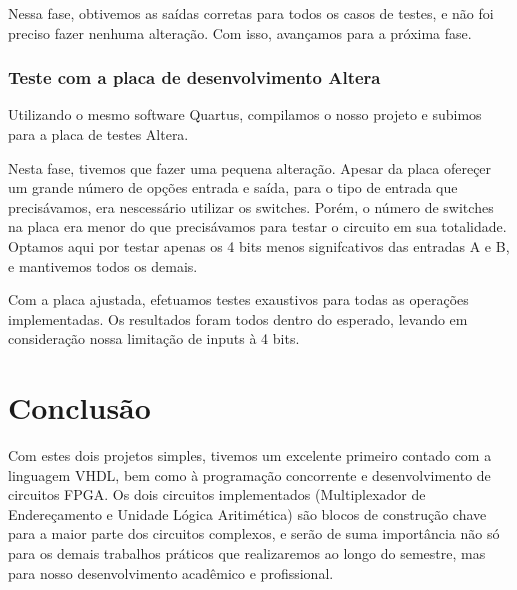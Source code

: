 \documentclass{article}
\begin{document}
Nessa fase, obtivemos as saídas corretas para todos os casos de testes, e não foi preciso fazer nenhuma alteração. Com isso, avançamos para a próxima fase.

\subsubsection{Teste com a placa de desenvolvimento Altera}
Utilizando o mesmo software Quartus, compilamos o nosso projeto e subimos para a placa de testes Altera.

Nesta fase, tivemos que fazer uma pequena alteração. Apesar da placa ofereçer um grande número de opções entrada e saída, para o tipo de entrada que precisávamos, era nescessário utilizar os switches. Porém, o número de switches na placa era menor do que precisávamos para testar o circuito em sua totalidade. Optamos aqui por testar apenas os 4 bits menos signifcativos das entradas A e B, e mantivemos todos os demais.

Com a placa ajustada, efetuamos testes exaustivos para todas as operações implementadas. Os resultados foram todos dentro do esperado, levando em consideração nossa limitação de inputs à 4 bits.

\section{Conclusão}
Com estes dois projetos simples, tivemos um excelente primeiro contado com a linguagem VHDL, bem como à programação concorrente e desenvolvimento de circuitos FPGA. Os dois circuitos implementados (Multiplexador de Endereçamento e Unidade Lógica Aritimética) são blocos de construção chave para a maior parte dos circuitos complexos, e serão de suma importância não só para os demais trabalhos práticos que realizaremos ao longo do semestre, mas para nosso desenvolvimento acadêmico e profissional.
\end{document}
